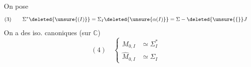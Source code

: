 On pose
\[
(3)\qquad\Sigma^*\deleted{\unsure{(I)}}=\Sigma_I\deleted{\unsure{\alpha(I)}}=\Sigma-\deleted{\unsure{\{}}J
\]
On a des iso. canoniques (sur $\mathbb C$)
\[
(4)\quad\left\{\begin{aligned}
M_{0,I}&\simeq\Sigma_I^*\\
\widehat M_{0,I}&\simeq\Sigma_I
\end{aligned}\right.
\]
